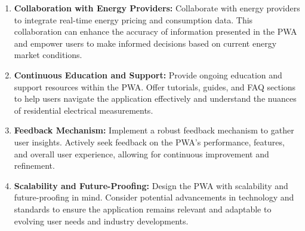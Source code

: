 \documentclass{article}
\begin{document}
\begin{multicols}{2}
\begin{enumerate}
    \item \textbf{Collaboration with Energy Providers:} Collaborate with energy providers to integrate real-time energy pricing and consumption data. This collaboration can enhance the accuracy of information presented in the PWA and empower users to make informed decisions based on current energy market conditions.
    
    \item \textbf{Continuous Education and Support:} Provide ongoing education and support resources within the PWA. Offer tutorials, guides, and FAQ sections to help users navigate the application effectively and understand the nuances of residential electrical measurements.
    
    \item \textbf{Feedback Mechanism:} Implement a robust feedback mechanism to gather user insights. Actively seek feedback on the PWA's performance, features, and overall user experience, allowing for continuous improvement and refinement.
    
    \item \textbf{Scalability and Future-Proofing:} Design the PWA with scalability and future-proofing in mind. Consider potential advancements in technology and standards to ensure the application remains relevant and adaptable to evolving user needs and industry developments.
\end{enumerate}
     
\end{multicols}  %
\end{document}
